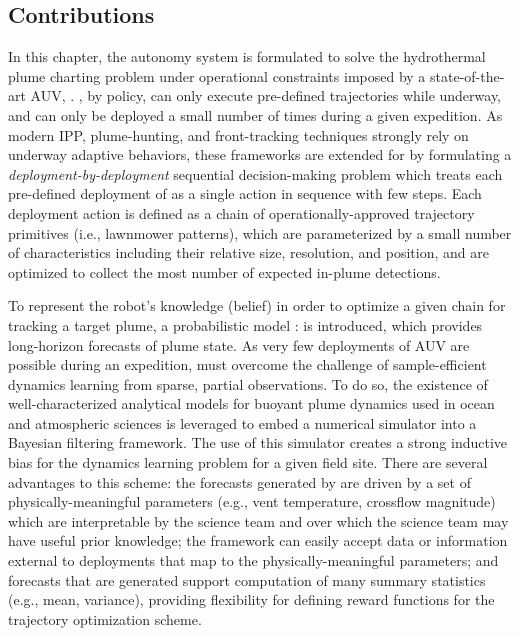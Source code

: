 \subsection{Contributions}
In this chapter, the autonomy system \PHORTEX is formulated to solve the hydrothermal plume charting problem under operational constraints imposed by a state-of-the-art AUV, \Sentry. \Sentry, by policy, can only execute pre-defined trajectories while underway, and can only be deployed a small number of times during a given expedition. As modern IPP, plume-hunting, and front-tracking techniques strongly rely on underway adaptive behaviors, these frameworks are extended for \Sentry by formulating a \emph{deployment-by-deployment} sequential decision-making problem which treats each pre-defined deployment of \Sentry as a single action in sequence with few steps. Each deployment action is defined as a chain of operationally-approved trajectory primitives (i.e., lawnmower patterns), which are parameterized by a small number of characteristics including their relative size, resolution, and position, and are optimized to collect the most number of expected in-plume detections.

To represent the robot's knowledge (belief) in order to optimize a given chain for tracking a target plume, a probabilistic model \PHUMES: \phumes is introduced, which provides long-horizon forecasts of plume state. As very few deployments of AUV \Sentry are possible during an expedition, \PHUMES must overcome the challenge of sample-efficient dynamics learning from sparse, partial observations. To do so, the existence of well-characterized analytical models for buoyant plume dynamics used in ocean and atmospheric sciences is leveraged to embed a numerical simulator into a Bayesian filtering framework. The use of this simulator creates a strong inductive bias for the dynamics learning problem for a given field site. There are several advantages to this scheme: the forecasts generated by \PHUMES are driven by a set of physically-meaningful parameters (e.g., vent temperature, crossflow magnitude) which are interpretable by the science team and over which the science team may have useful prior knowledge; the \PHUMES framework can easily accept data or information external to \Sentry deployments that map to the physically-meaningful parameters; and forecasts that are generated support computation of many summary statistics (e.g., mean, variance), providing flexibility for defining reward functions for the trajectory optimization scheme.

